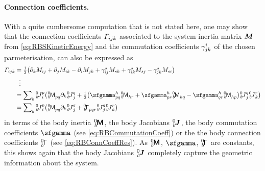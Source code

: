\paragraph{Connection coefficients.}
With a quite cumbersome computation that is not stated here, one may show that the connection coefficients $\varGamma_{ijk}$ associated to the system inertia matrix $\boldsymbol{M}$ from \eqref{eq:RBSKineticEnergy} and the commutation coefficients $\gamma^{i}_{jk}$ of the chosen parmeterisation, can also be expressed as
\begin{subequations}\label{eq:RBSConnCoeff}
\begin{align}
 \ConnCoeffL{\LidxI}{\LidxII}{\LidxIII} 
 &= \tfrac{1}{2}\big( \dirDiff{\LidxIII} \sysInertiaMatCoeff{\LidxI\LidxII} + \dirDiff{\LidxII} \sysInertiaMatCoeff{\LidxI\LidxIII} - \dirDiff{\LidxI} \sysInertiaMatCoeff{\LidxII\LidxIII} + \BoltzSym{\LidxV}{\LidxI}{\LidxII} \sysInertiaMatCoeff{\LidxV\LidxIII} + \BoltzSym{\LidxV}{\LidxI}{\LidxIII} \sysInertiaMatCoeff{\LidxV\LidxII} - \BoltzSym{\LidxV}{\LidxII}{\LidxIII} \sysInertiaMatCoeff{\LidxV\LidxI} \big)
\\
 &\ \ \vdots \nonumber
\\
 &= \sumBodies \bodyJacCoeff{0}{\BidxII}{\LBidxI}{\LidxI} \big( \bodyInertiaMatCoeff{0}{\BidxII}{\LBidxI\LBidxII} \dirDiff{\LidxIII} \bodyJacCoeff{0}{\BidxII}{\LBidxII}{\LidxII} + \tfrac{1}{2} \big( \bodyBoltzSym{\LBidxIV}{\LBidxI}{\LBidxII} \bodyInertiaMatCoeff{0}{\BidxII}{\LBidxIV\LBidxIII} + \bodyBoltzSym{\LBidxIV}{\LBidxI}{\LBidxIII} \bodyInertiaMatCoeff{0}{\BidxII}{\LBidxIV\LBidxII} - \bodyBoltzSym{\LBidxIV}{\LBidxII}{\LBidxIII} \bodyInertiaMatCoeff{0}{\BidxII}{\LBidxIV\LBidxI} \big) \bodyJacCoeff{0}{\BidxII}{\LBidxII}{\LidxII} \bodyJacCoeff{0}{\BidxII}{\LBidxIII}{\LidxIII} \big)
\\
 &= \sumBodies \bodyJacCoeff{0}{\BidxII}{\LBidxI}{\LidxI} \big( \bodyInertiaMatCoeff{0}{\BidxII}{\LBidxI\LBidxII} \dirDiff{\LidxIII} \bodyJacCoeff{0}{\BidxII}{\LBidxII}{\LidxII} + \bodyConnCoeffL{0}{\BidxII}{\LBidxI}{\LBidxII}{\LBidxIII} \bodyJacCoeff{0}{\BidxII}{\LBidxII}{\LidxII} \bodyJacCoeff{0}{\BidxII}{\LBidxIII}{\LidxIII} \big)
 \label{eq:RBSConnCoeffL3}
\end{align}
\end{subequations}
in terms of the body inertia $\bodyInertiaMat{0}{\BidxII}$, the body Jacobians $\bodyJac{0}{\BidxII}$, the body commutation coefficients $\bodyBoltzSym{}{}{}$ (see \eqref{eq:RBCommutationCoeff}) or the the body connection coefficients $\bodyConnCoeffL{0}{\BidxII}{}{}{}$ (see \eqref{eq:RBConnCoeffRes}).
As $\bodyInertiaMat{0}{\BidxII}$, $\bodyBoltzSym{}{}{}$, $\bodyConnCoeffL{0}{\BidxII}{}{}{}$ are constants, this shows again that the body Jacobians $\bodyJac{0}{\BidxII}$ completely capture the geometric information about the system.

